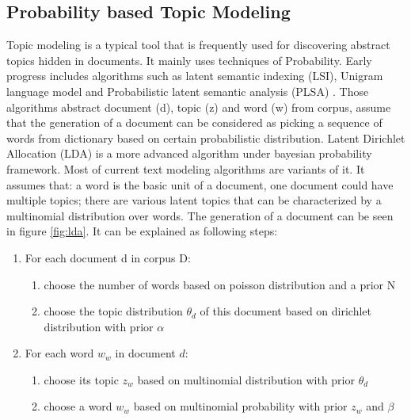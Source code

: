 \subsection{Probability based Topic Modeling}
\label{sec:topic modeling}
Topic modeling is a typical tool that is frequently used for discovering abstract topics hidden in documents. It mainly uses techniques of Probability. Early progress includes algorithms such as latent semantic indexing (LSI), Unigram language model and Probabilistic latent semantic analysis (PLSA) \cite{hofmann1999probabilistic, baeza1999modern}. Those algorithms abstract document (d), topic (z) and word (w) from corpus, assume that the generation of a document can be considered as picking a sequence of words from dictionary based on certain probabilistic distribution. Latent Dirichlet Allocation (LDA) \cite{blei2003latent} is a more advanced algorithm under bayesian probability framework. Most of current text modeling algorithms are variants of it. It assumes that: a word is the basic unit of a document, one document could have multiple topics; there are various latent topics that can be characterized by a multinomial distribution over words. The generation of a document can be seen in figure \ref{fig:lda}. It can be explained as following steps: 
\begin{enumerate}
    \item For each document d in corpus D:
    \begin{enumerate}
        \item choose the number of words based on poisson distribution and a prior N
        \item choose the topic distribution {$\theta_d$} of this document based on dirichlet distribution with prior {$\alpha$}
    \end{enumerate}
    \item For each word {$w_w$} in document {$d$}:
    \begin{enumerate}
        \item choose its topic {$z_w$} based on multinomial distribution with prior {$\theta_d$}
        \item choose a word {$w_w$} based on multinomial probability with prior {$z_w$} and {$\beta$}
    \end{enumerate}
\end{enumerate}
